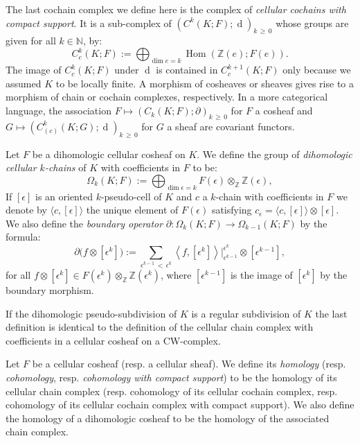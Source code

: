 \documentclass[AHL,Unicode,longabstracts,published]{cedram}
\newcommand{\Z}{\mathbb{Z}}
\newcommand{\N}{\mathbb{N}}
\DeclareMathOperator{\Hom}{Hom}
\DeclareMathOperator{\df}{d}
\begin{document}
\begin{defi}
The last cochain complex we define here is the complex of \emph{cellular cochains with compact support}. It is a sub-complex of $(C^k(K;F);\df)_{k\,\geq \,0}$ whose groups are given for all $k\in \N$, by:
\begin{equation*}
C_c^k(K;F):=\bigoplus_{\dim e = k} \Hom(\Z(e);F(e)).
\end{equation*}
The image of $C_c^k(K;F)$ under $\df$ is contained in $C_c^{k+1}(K;F)$ only because we assumed $K$ to be locally finite. A morphism of cosheaves or sheaves gives rise to a morphism of chain or cochain complexes, respectively. In a more categorical language, the association $F\mapsto (C_k(K;F);\partial)_{k\,\geq\,0}$ for $F$ a cosheaf and $G\mapsto (C_{(c)}^k(K;G);\df)_{k\,\geq\,0}$ for $G$ a sheaf are covariant functors.
\end{defi}

\begin{defi}
Let $F$ be a dihomologic cellular cosheaf on $K$. We define the group of \emph{dihomologic cellular $k$-chains} of $K$ with coefficients in $F$ to be:
\begin{equation*}
\Omega_k(K;F):=\bigoplus_{\dim \epsilon = k} F(\epsilon)\otimes_\Z\Z(\epsilon),
\end{equation*}
If $[\epsilon]$ is an oriented $k$-pseudo-cell of $K$ and $c$ a $k$-chain with coefficients in $F$ we denote by $\langle c,[\epsilon]\rangle$ the unique element of $F(\epsilon)$ satisfying $c_\epsilon=\langle c,[\epsilon]\rangle\otimes [\epsilon]$. We also define the \emph{boundary operator} $\partial : \Omega_k(K;F) \rightarrow \Omega_{k-1}(K;F)$ by the formula:
\begin{equation*}
\partial \big(f\otimes[\epsilon^k]\big) :=\sum_{\epsilon^{k-1}\,<\,\epsilon^k} \left\langle f,[\epsilon^k]\right\rangle\big|^{\epsilon^k}_{\epsilon^{k-1}}\otimes \left[\epsilon^{k-1}\right],
\end{equation*}
for all $f\otimes[\epsilon^k] \in F(\epsilon^k)\otimes_\Z\Z(\epsilon^k)$, where $[\epsilon^{k-1}]$ is the image of $[\epsilon^k]$ by the boundary morphism.
\end{defi}

\begin{rema}
If the dihomologic pseudo-subdivision of $K$ is a regular subdivision of $K$ the last definition is identical to the definition of the cellular chain complex with coefficients in a cellular cosheaf on a CW-complex.
\end{rema}

\begin{defi}
Let $F$ be a cellular cosheaf (resp. a cellular sheaf). We define its \emph{homology} (resp. \emph{cohomology}, resp. \emph{cohomology with compact support}) to be the homology of its cellular chain complex (resp. cohomology of its cellular cochain complex, resp. cohomology of its cellular cochain complex with compact support). We also define the homology of a dihomologic cosheaf to be the homology of the associated chain complex.
\end{defi}
\end{document}
